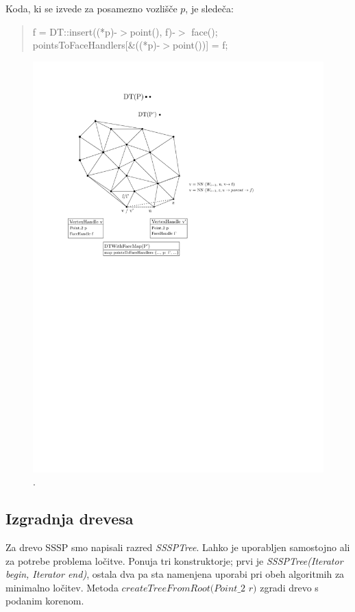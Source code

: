 \documentclass[a4paper, 12pt]{book}
\newcommand{\U}{\texttt{\_}}
\begin{document}
Koda, ki se izvede za posamezno vozlišče $p$, je sledeča:

\begin{quote}
f = DT::insert((*p)-$>$point(), f)-$>$ face();\\
pointsToFaceHandlers[\&((*p)-$>$point())] = f;
\end{quote}

\begin{figure}
\centerline{\includegraphics{pics/pointsToFaceHandlers.pdf}}
\caption{.}
\label{pointsToFace}
\end{figure}

\subsection{Izgradnja drevesa} 

Za drevo SSSP smo napisali razred \textit{SSSPTree}. Lahko je uporabljen samostojno ali za potrebe problema ločitve. Ponuja tri konstruktorje; prvi je \textit{SSSPTree(Iterator begin, Iterator end)}, ostala dva pa sta namenjena uporabi pri obeh algoritmih za minimalno ločitev. Metoda $createTreeFromRoot(Point\U 2$ $r)$ zgradi drevo s podanim korenom. 
\end{document}

